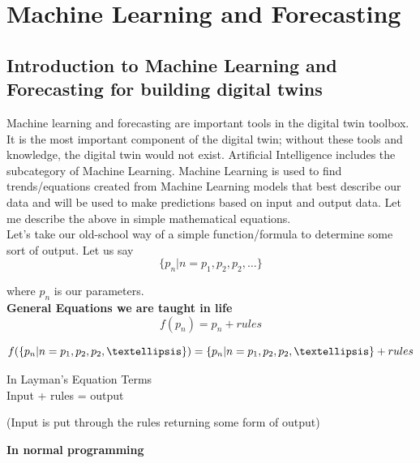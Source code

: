 \section{Machine Learning and Forecasting}
\subsection{Introduction to Machine Learning and Forecasting for building digital twins}

Machine learning and forecasting are important tools in the digital twin toolbox. It is the most important component of the digital twin; without these tools and knowledge, the digital twin would not exist. Artificial Intelligence includes the subcategory of Machine Learning. Machine Learning is used to find trends/equations created from Machine Learning models that best describe our data and will be used to make predictions based on input and output data.
Let me describe the above in simple mathematical equations. \\

Let’s take our old-school way of a simple function/formula to determine some sort of output. Let us say
\begin{equation}
    \{p_n | n=p_1,p_2,p_2,\dots\}
\end{equation}

where $p_n$ is our parameters.\\

\textbf{General Equations we are taught in life} \\


\begin{equation}
    f(p_n)= p_n+rules
\end{equation}

\begin{equation}
    f(\{p_n | n=p_1,p_2,p_2,…\}) = \{p_n | n=p_1,p_2,p_2,…\}+rules \\
\end{equation}


\begin{center}
In Layman’s Equation Terms \\ 
Input + rules = output \\ 
\end{center}

\begin{center}
    (Input is put through the rules returning some form of output)
\end{center}


\textbf{In normal programming} \\


